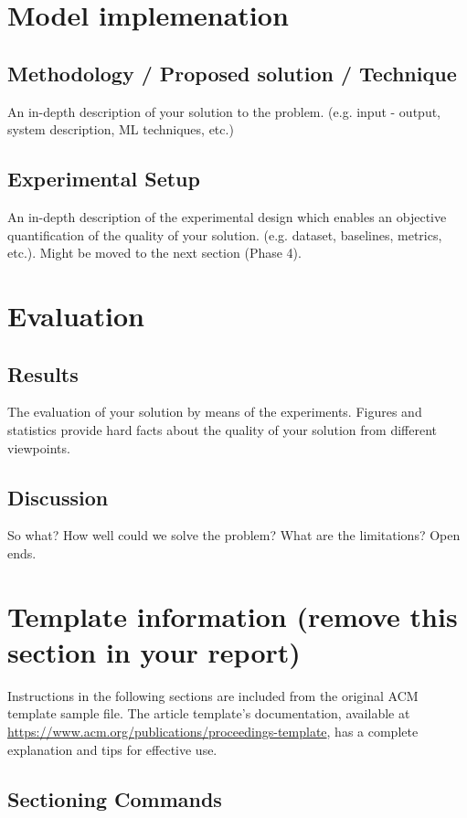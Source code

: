 \documentclass[sigconf]{acmart}
\begin{document}
\section{Model implemenation}
\subsection{Methodology / Proposed solution / Technique}
An in-depth description of your solution to the problem. (e.g. input - output, system description, ML techniques, etc.)

\subsection{Experimental Setup}
An in-depth description of the experimental design which enables an objective quantification of the quality of your solution. (e.g. dataset, baselines, metrics, etc.).
Might be moved to the next section (Phase 4).

\section{Evaluation}
\subsection{Results}
The evaluation of your solution by means of the experiments. 
Figures and statistics provide hard facts about the quality of your solution from different viewpoints.

\subsection{Discussion}
So what? 
How well could we solve the problem? 
What are the limitations? 
Open ends.


\section*{Template information (remove this section in your report)}
\label{sec:template-information}
Instructions in the following sections are included from the original ACM template sample file.
The article template's documentation, available at
\url{https://www.acm.org/publications/proceedings-template}, has a
complete explanation and tips for effective use.

\subsection*{Sectioning Commands}
\end{document}
